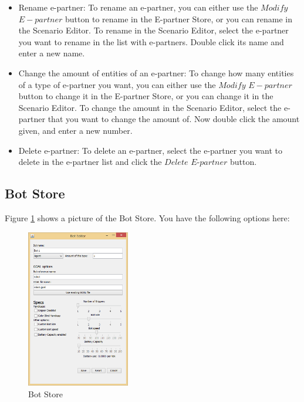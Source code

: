 \documentclass[11pt,a4paper]{article}
\begin{document}
\begin{itemize}
\item{Rename e-partner}:
To rename an e-partner, you can either use the $Modify$ $E-partner$ button to rename in the E-partner Store, or you can rename in the Scenario Editor. To rename in the Scenario Editor, select the e-partner you want to rename in the list with e-partners. Double click its name and enter a new name.

\item{Change the amount of entities of an e-partner}:
To change how many entities of a type of e-partner you want, you can either use the $Modify$ $E-partner$ button to change it in the E-partner Store, or you can change it in the Scenario Editor. To change the amount in the Scenario Editor, select the e-partner that you want to change the amount of. Now double click the amount given, and enter a new number.

\item{Delete e-partner}:
To delete an e-partner, select the e-partner you want to delete in the e-partner list and click the $Delete$ $E$-$partner$ button.

\end{itemize}

\subsection{Bot Store}
Figure \ref{fig:BotStore} shows a picture of the Bot Store. You have the following options here:

\begin{figure}[h]
\begin{center}
\includegraphics[width=0.4\textwidth]{bs.png}
\end{center}
\caption{Bot Store}\label{fig:BotStore}
\end{figure}
\end{document}
